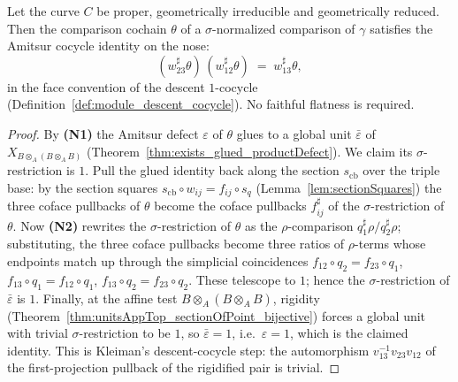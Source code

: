 \begin{theorem}
  \label{thm:normalizedComparison_coherent}
  \leanok
  Let the curve \(C\) be proper, geometrically irreducible and geometrically reduced. Then the
  comparison cochain \(\theta\) of a \(\sigma\)-normalized comparison of \(\gamma\) satisfies the
  Amitsur cocycle identity on the nose:
  \[
    (w_{23}^{\sharp}\theta)\,(w_{12}^{\sharp}\theta) \;=\; w_{13}^{\sharp}\theta ,
  \]
  in the face convention of the descent \(1\)-cocycle (Definition~\ref{def:module_descent_cocycle}).
  No faithful flatness is required.
\end{theorem}
\begin{proof}
  \leanok
  By \textbf{(N1)} the Amitsur defect \(\varepsilon\) of \(\theta\) glues to a global unit
  \(\bar\varepsilon\) of \(X_{B \otimes_A (B \otimes_A B)}\)
  (Theorem~\ref{thm:exists_glued_productDefect}). We claim its \(\sigma\)-restriction is \(1\).
  Pull the glued identity back along the section \(s_{\mathrm{cb}}\) over the triple base: by the
  section squares \(s_{\mathrm{cb}} \circ w_{ij} = f_{ij} \circ s_q\)
  (Lemma~\ref{lem:sectionSquares}) the three coface pullbacks of \(\theta\) become the coface
  pullbacks \(f_{ij}^{\sharp}\) of the \(\sigma\)-restriction of \(\theta\). Now \textbf{(N2)}
  rewrites the \(\sigma\)-restriction of \(\theta\) as the \(\rho\)-comparison \(q_1^{\sharp}\rho /
  q_2^{\sharp}\rho\); substituting, the three coface pullbacks become three ratios of
  \(\rho\)-terms whose endpoints match up through the simplicial coincidences \(f_{12} \circ q_2 =
  f_{23} \circ q_1\), \(f_{13} \circ q_1 = f_{12} \circ q_1\), \(f_{13} \circ q_2 = f_{23} \circ
  q_2\). These telescope to \(1\); hence the \(\sigma\)-restriction of \(\bar\varepsilon\) is \(1\).
  Finally, at the affine test \(B \otimes_A (B \otimes_A B)\), rigidity
  (Theorem~\ref{thm:unitsAppTop_sectionOfPoint_bijective}) forces a global unit with trivial
  \(\sigma\)-restriction to be \(1\), so \(\bar\varepsilon = 1\), i.e.\ \(\varepsilon = 1\), which is
  the claimed identity. This is Kleiman's descent-cocycle step: the automorphism
  \(v_{13}^{-1}v_{23}v_{12}\) of the first-projection pullback of the rigidified pair is trivial.
\end{proof}

